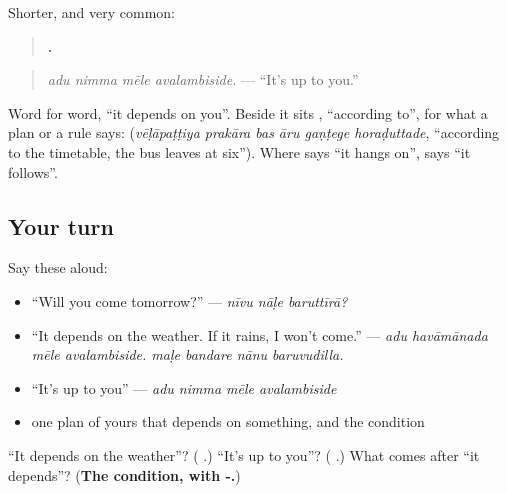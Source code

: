 Shorter, and very common:

\begin{quote}
\textbf{   .}
\end{quote}

\begin{quote}
\emph{adu nimma mēle avalambiside.} — \textquotedblleft{}It's up to you.\textquotedblright{}
\end{quote}

Word for word, \textquotedblleft{}it depends on you\textquotedblright{}. Beside it sits \textbf{}, \textquotedblleft{}according to\textquotedblright{}, for what a plan or a rule says: \textbf{     } (\emph{vēḷāpaṭṭiya prakāra bas āru gaṇṭege horaḍuttade}, \textquotedblleft{}according to the timetable, the bus leaves at six\textquotedblright{}). Where \textbf{} says \textquotedblleft{}it hangs on\textquotedblright{}, \textbf{} says \textquotedblleft{}it follows\textquotedblright{}.

\subsection*{Your turn}
Say these aloud:

\begin{itemize}
\raggedright
  \item \textquotedblleft{}Will you come tomorrow?\textquotedblright{} — \emph{nīvu nāḷe baruttīrā?}
  \item \textquotedblleft{}It depends on the weather. If it rains, I won't come.\textquotedblright{} — \emph{adu havāmānada mēle avalambiside. maḷe bandare nānu baruvudilla.}
  \item \textquotedblleft{}It's up to you\textquotedblright{} — \emph{adu nimma mēle avalambiside}
  \item one plan of yours that depends on something, and the condition
\end{itemize}

\begin{tcolorbox}[breakable,colback=teal!4,colframe=teal!35!black,title={Before you move on}]
\textquotedblleft{}It depends on the weather\textquotedblright{}? (\textbf{   }.) \textquotedblleft{}It's up to you\textquotedblright{}? (\textbf{   }.) What comes after \textquotedblleft{}it depends\textquotedblright{}? (\textbf{The condition, with -.})
\end{tcolorbox}
